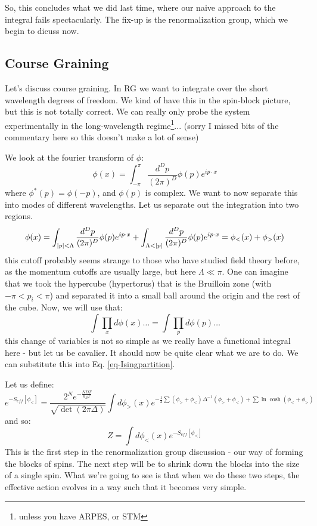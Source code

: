 So, this concludes what we did last time, where our naive approach to the integral fails spectacularly. The fix-up is the renormalization group, which we begin to dicuss now.

\subsection{Course Graining}
Let's discuss course graining. In RG we want to integrate over the short wavelength degrees of freedom. We kind of have this in the spin-block picture, but this is not totally correct. We can really only probe the system experimentally in the long-wavelength regime\footnote{unless you have ARPES, or STM}... (sorry I missed bits of the commentary here so this doesn't make a lot of sense)

We look at the fourier transform of $\phi$:
\begin{equation}
    \phi(x) = \int_{-\pi}^\pi \frac{d^Dp}{(2\pi)^D}\phi(p)e^{ip\cdot x}
\end{equation}
where $\phi^*(p) = \phi(-p)$, and $\phi(p)$ is complex. We want to now separate this into modes of different wavelengths. Let us separate out the integration into two regions.
\begin{equation}
    \phi(x) = \int_{\abs{p} < \Lambda} \frac{d^Dp}{(2\pi)^D}\phi(p)e^{ip \cdot x} + \int_{\Lambda < \abs{p}} \frac{d^Dp}{(2\pi)^D}\phi(p)e^{ip \cdot x} = \phi_<(x) + \phi_>(x)
\end{equation}
this cutoff probably seems strange to those who have studied field theory before, as the momentum cutoffs are usually large, but here $\Lambda \ll \pi$. One can imagine that we took the hypercube (hypertorus) that is the Bruilloin zone (with $-\pi < p_i < \pi$) and separated it into a small ball around the origin and the rest of the cube. Now, we will use that:
\begin{equation}
    \int\prod_x d\phi(x)\ldots = \int \prod_p d\phi(p)\ldots
\end{equation}
this change of variables is not so simple as we really have a functional integral here - but let us be cavalier. It should now be quite clear what we are to do. We can substitute this into Eq. \eqref{eq-Isingpartition}.

Let us define:
\begin{equation}
    e^{-S_{eff}[\phi_<]} = \frac{2^Ne^{-\frac{NDT}{k_B T}}}{\sqrt{\det(2\pi\Delta)}}\int d\phi_>(x) e^{-\frac{1}{2}\sum(\phi_> + \phi_<)\Delta^{-1}(\phi_> + \phi_<) + \sum \ln\cosh(\phi_< + \phi_>)}
\end{equation}
and so:
\begin{equation}
    Z = \int d\phi_<(x) e^{-S_{eff}[\phi_<]}
\end{equation}
This is the first step in the renormalization group discussion - our way of forming the blocks of spins. The next step will be to shrink down the blocks into the size of a single spin. What we're going to see is that when we do these two steps, the effective action evolves in a way such that it becomes very simple.

